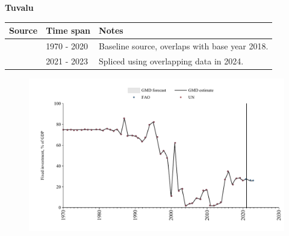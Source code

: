 \documentclass[12pt,a4paper,landscape]{article}
\begin{document}
\begin{adjustbox}{max totalsize={\paperwidth}{\paperheight},center}
\begin{minipage}[t][\textheight][t]{\textwidth}
\vspace*{0.5cm}
{}
\begin{center}
{\Large\bfseries Tuvalu}
\end{center}
\vspace{0.5cm}
\begin{table}[H]
\centering
\small
\begin{tabular}{|l|l|l|}
\hline
\textbf{Source} & \textbf{Time span} & \textbf{Notes} \\
\hline
\rowcolor{white}\cite{UN}& 1970 - 2020 &Baseline source, overlaps with base year 2018.\\
\rowcolor{lightgray}\cite{FAO}& 2021 - 2023 &Spliced using overlapping data in 2024.\\
\hline
\end{tabular}
\end{table}
\begin{figure}[H]
\centering
\includegraphics[width=\textwidth,height=0.6\textheight,keepaspectratio]{graphs/TUV_finv_GDP.pdf}
\end{figure}
\end{minipage}
\end{adjustbox}
\end{document}
